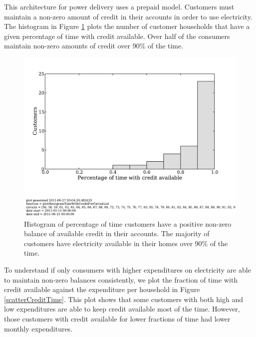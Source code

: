 \documentclass{sig-alternate}
\begin{document}

This architecture for power delivery uses a prepaid model.
Customers must maintain a non-zero amount of credit in their accounts in order
to use electricity.
The histogram in Figure \ref{creditHistogram} plots the number of customer households
that have a given percentage of time with credit available.
Over half of the consumers maintain non-zero amounts of credit over 90\% of
the time.



\begin{figure}[]
\begin{center}
\includegraphics[trim = 0in 1.3in 0in 0in, clip, width=\columnwidth]
                {figures/creditHistogram.pdf}
\end{center}
\caption{Histogram of percentage of time customers have a positive non-zero balance
of available credit in their accounts.  The majority of customers have electricity
available in their homes over 90\% of the time.}
\label{creditHistogram}
\end{figure}

To understand if only consumers with higher expenditures on electricity
are able to maintain non-zero balances consistently, we plot the fraction of
time with credit available against the expenditure per household in
Figure \ref{scatterCreditTime}.
This plot
shows that some customers with both high and low expenditures are able
to keep credit available most of the time.
However, those customers with credit available for lower fractions of time had lower
monthly expenditures.
\end{document}
